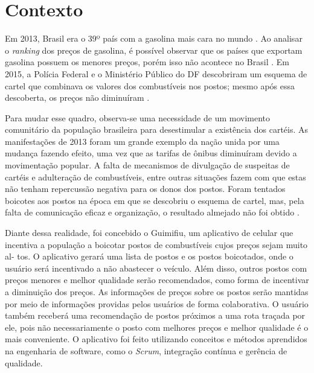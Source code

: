 \section{Contexto}

Em 2013, Brasil era o 39º país com a gasolina mais cara no mundo \cite{oglobo}. Ao analisar o \textit{ranking} dos preços de gasolina, é possível observar que os países que exportam gasolina possuem os menores preços, porém isso não acontece no Brasil \cite{ranking-precos}. Em 2015, a Polícia Federal e o Ministério Público do DF descobriram um esquema de cartel que combinava os valores dos combustíveis nos postos; mesmo após essa descoberta, os preços não diminuíram \cite{correio-cartel}.

Para mudar esse quadro, observa-se uma necessidade de um movimento comunitário da população brasileira para desestimular a existência dos cartéis. As manifestações de 2013 foram um grande exemplo da nação unida por uma mudança fazendo efeito, uma vez que as tarifas de ônibus diminuíram devido a movimentação popular. A falta de mecanismos de divulgação de suspeitas de cartéis \cite{manifestacoes-2013} e adulteração de combustíveis, entre outras situações fazem com que estas não tenham repercussão negativa para os donos dos postos. Foram tentados boicotes aos postos na época em que se descobriu o esquema de cartel, mas, pela falta de comunicação eficaz e organização, o resultado almejado não foi obtido \cite{boicotes-2016}.

Diante dessa realidade, foi concebido o Guimifiu, um aplicativo de celular que incentiva a população a boicotar postos de combustíveis cujos preços sejam muito al- tos. O aplicativo gerará uma lista de postos e os postos boicotados, onde o usuário será incentivado a não abastecer o veículo. Além disso, outros postos com preços menores e melhor qualidade serão recomendados, como forma de incentivar a diminuição dos preços. As informações de preços sobre os postos serão mantidas por meio de informações providas pelos usuários de forma colaborativa. O usuário também receberá uma recomendação de postos próximos a uma rota traçada por ele, pois não necessariamente o posto com melhores preços e melhor qualidade é o mais conveniente. O aplicativo foi feito utilizando conceitos e métodos aprendidos na engenharia de software, como o \textit{Scrum}, integração contínua e gerência de qualidade.
